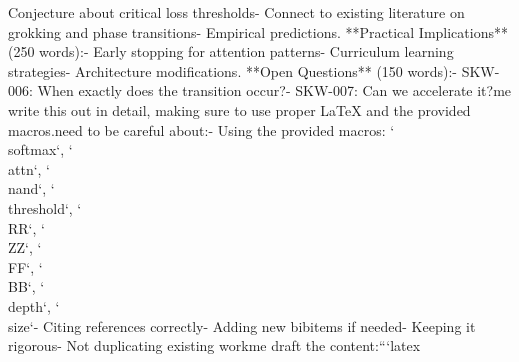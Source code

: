 Conjecture about critical loss thresholds\n   - Connect to existing literature on grokking and phase transitions\n   - Empirical predictions\n{}. **Practical Implications** (250 words):\n   - Early stopping for attention patterns\n   - Curriculum learning strategies\n   - Architecture modifications\n{}. **Open Questions** (150 words):\n   - SKW-006: When exactly does the transition occur?\n   - SKW-007: Can we accelerate it?\n\nLet me write this out in detail, making sure to use proper LaTeX and the provided macros.\n\nI need to be careful about:\n- Using the provided macros: `\\softmax`, `\\attn`, `\\nand`, `\\threshold`, `\\RR`, `\\ZZ`, `\\FF`, `\\BB`, `\\depth`, `\\size`\n- Citing references correctly\n- Adding new bibitems if needed\n- Keeping it rigorous\n- Not duplicating existing work\n\nLet me draft the content:\n\n```latex\n%